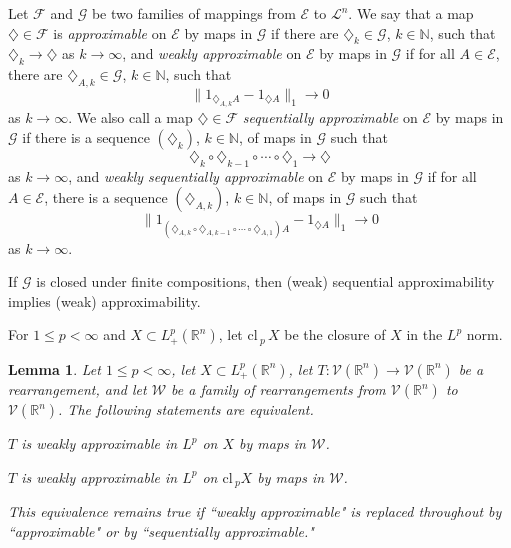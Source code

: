 \documentclass[12pt,reqno]{amsart}
\newcommand{\N}{{\mathbb N}}
\newcommand{\R}{{\mathbb R}}
\newcommand{\cL}{\mathcal L}
\newcommand{\cF}{\mathcal F}
\newcommand{\cG}{\mathcal G}
\newcommand{\cE}{{\mathcal E}}
\newcommand{\cV}{{\mathcal V}}
\newcommand{\cW}{{\mathcal W}}
\newtheorem{lem}[thm]{Lemma}
\newcommand{\cl}{{\mathrm{cl}}\,}
\newcommand{\di}{\diamondsuit}
\numberwithin{equation}{section}
\begin{document}
Let $\cF$ and $\cG$ be two families of mappings from $\cE$ to $\cL^n$.  We say that a map $\di\in\cF$ is {\em approximable} on $\cE$ by maps in $\cG$ if there are $\di_k\in \cG$, $k\in \N$, such that $\di_k\to \di$ as $k\to \infty$, and {\em weakly approximable} on $\cE$ by maps in $\cG$ if for all $A\in \cE$, there are $\di_{A,k}\in \cG$, $k\in \N$, such that
$$
\|1_{\di_{A,k}A}-1_{\di A}\|_1\to 0
$$
as $k\to \infty$.  We also call a map $\di\in\cF$ {\em sequentially approximable} on $\cE$ by maps in $\cG$ if there is a sequence $(\di_k)$, $k\in \N$, of maps in $\cG$ such that
$$
\di_k\circ\di_{k-1}\circ \cdots\circ\di_1\longrightarrow \di
$$
as $k\to \infty$, and {\em weakly sequentially approximable} on $\cE$ by maps in $\cG$ if for all $A\in \cE$, there is a sequence $(\di_{A,k})$, $k\in \N$, of maps in $\cG$ such that
$$
\|1_{(\di_{A,k}\circ\di_{A,k-1}\circ \cdots\circ\di_{A,1})A}-1_{\di A}\|_1 \to 0
$$
as $k\to \infty$.

If $\cG$ is closed under finite compositions, then (weak) sequential approximability implies (weak) approximability.

For $1\le p<\infty$ and $X\subset L^p_+(\R^n)$, let $\cl_{\!p}\,X$ be the closure of $X$ in the $L^p$ norm.

\begin{lem}\label{lemLpclosure}
Let $1\le p<\infty$, let $X\subset L^p_+(\R^n)$, let $T:\cV(\R^n)\to \cV(\R^n)$ be a rearrangement, and let $\cW$ be a family of rearrangements from $\cV(\R^n)$ to $\cV(\R^n)$.  The following statements are equivalent.

 $T$ is weakly approximable in $L^p$ on $X$ by maps in $\cW$.

 $T$ is weakly approximable in $L^p$ on $\cl_{\!p} X$ by maps in $\cW$.

This equivalence remains true if ``weakly approximable" is replaced throughout by ``approximable" or by ``sequentially approximable."
\end{lem}
\end{document}
